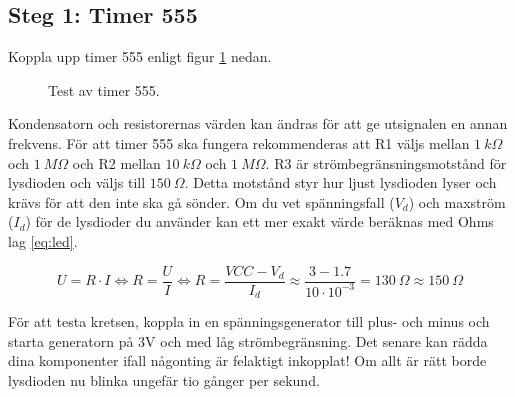 \documentclass{article}
\begin{document}
\subsection*{Steg 1: Timer 555}
Koppla upp timer 555 enligt figur \ref{fig:555sch} nedan.

\begin{figure}[h]
\centering
{}
\hspace{20pt}
\caption{Test av timer 555.}
\label{fig:555sch}
\end{figure}

Kondensatorn och resistorernas värden kan ändras för att ge utsignalen en annan frekvens. För att timer 555 ska fungera rekommenderas att R1 väljs mellan $1~k\Omega$ och $1~M\Omega$ och R2 mellan $10~k\Omega$ och $1~M\Omega$. R3 är strömbegränsningsmotstånd för lysdioden och väljs till $150~\Omega$. Detta motstånd styr hur ljust lysdioden lyser och krävs för att den inte ska gå sönder. Om du vet spänningsfall ($V_d$) och maxström ($I_d$) för de lysdioder du använder kan ett mer exakt värde beräknas med Ohms lag \eqref{eq:led}.

\begin{equation}\label{eq:led}
U = R\cdot I \Leftrightarrow R = \frac{U}{I} \Leftrightarrow R = \frac{VCC-V_{d} }{I_{d}} \approx \frac{3-1.7}{10\cdot 10^{-3}} = 130~\Omega \approx 150~\Omega
\end{equation}

För att testa kretsen, koppla in en spänningsgenerator till plus- och minus och starta generatorn på 3V och med låg strömbegränsning. Det senare kan rädda dina komponenter ifall någonting är felaktigt inkopplat! Om allt är rätt borde lysdioden nu blinka ungefär tio gånger per sekund.
\end{document}
